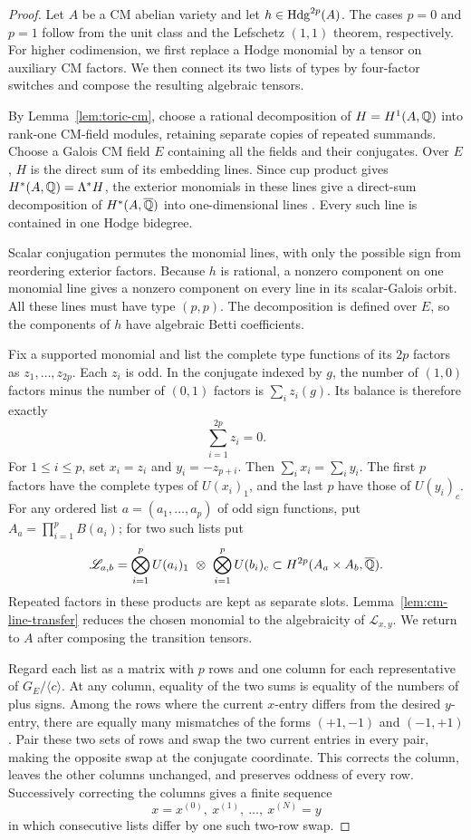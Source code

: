 \begin{proof}
Let \(A\) be a CM abelian variety and let \(h\in\operatorname{Hdg}^{2p}(A)\).
The cases \(p=0\) and \(p=1\) follow from the unit class and the
Lefschetz \((1,1)\) theorem, respectively.  For higher codimension,
we first replace a Hodge monomial by a tensor on auxiliary CM
factors.  We then connect its two lists of types by four-factor
switches and compose the resulting algebraic tensors.

By Lemma~\ref{lem:toric-cm}, choose
a rational decomposition of \(H=H^1(A,\mathbb{Q})\) into rank-one CM-field
modules, retaining separate copies of repeated summands.  Choose a
Galois CM field \(E\) containing all the fields and their conjugates.
Over \(E\), \(H\) is the direct sum of its embedding lines.  Since cup
product gives \(H^*(A,\mathbb{Q})=\Lambda^*H\), the exterior monomials in
these lines give a direct-sum decomposition of \(H^*(A,\overline{\mathbb{Q}})\) into
one-dimensional lines \cite[Proposition~6.4]{MilneShimura2017}.
Every such line is contained in one Hodge bidegree.

Scalar conjugation permutes the monomial
lines, with only the possible sign from reordering exterior factors.
Because \(h\) is rational, a nonzero component on one monomial line
gives a nonzero component on every line in its scalar-Galois orbit.
All these lines must have type \((p,p)\).  The decomposition is
defined over \(E\), so the components of \(h\) have algebraic Betti
coefficients.

Fix a supported monomial and list the complete type functions of its
\(2p\) factors as \(z_1,\ldots,z_{2p}\).  Each \(z_i\) is odd.  In the
conjugate indexed by \(g\), the number of \((1,0)\) factors minus the
number of \((0,1)\) factors is \(\sum_i z_i(g)\).  Its balance is
therefore exactly
\[
 \sum_{i=1}^{2p}z_i=0.
\]
For \(1\leq i\leq p\), set \(x_i=z_i\) and \(y_i=-z_{p+i}\).  Then
\(\sum_i x_i=\sum_i y_i\).  The first \(p\) factors have the complete
types of \(U(x_i)_1\), and the last \(p\) have those of \(U(y_i)_c\).
For any ordered list \(a=(a_1,\ldots,a_p)\) of odd sign functions,
put \(A_a=\prod_{i=1}^pB(a_i)\); for two such lists put
\[
 \mathscr L_{a,b}=
 \bigotimes_{i=1}^pU(a_i)_1\ \otimes\
 \bigotimes_{i=1}^pU(b_i)_c
 \subset H^{2p}(A_a\times A_b,\overline{\mathbb{Q}}).
\]
Repeated factors in these products are kept as separate slots.
Lemma~\ref{lem:cm-line-transfer} reduces the chosen monomial to the
algebraicity of \(\mathscr L_{x,y}\).  We return to \(A\) after
composing the transition tensors.

Regard each list as a matrix with \(p\) rows and one column for each
representative of \(G_E/\langle c\rangle\).  At any column, equality
of the two sums is equality of the numbers of plus signs.  Among the
rows where the current \(x\)-entry differs from the desired
\(y\)-entry, there are equally many mismatches of the forms
\((+1,-1)\) and \((-1,+1)\).  Pair these two sets of rows and swap the
two current entries in every pair, making the opposite swap at the
conjugate coordinate.  This corrects the column, leaves the other
columns unchanged, and preserves oddness of every row.
Successively correcting the columns gives a finite sequence
\[
 x=x^{(0)},\ x^{(1)},\ \ldots,\ x^{(N)}=y
\]
in which consecutive lists differ by one such two-row swap.


\end{proof}
